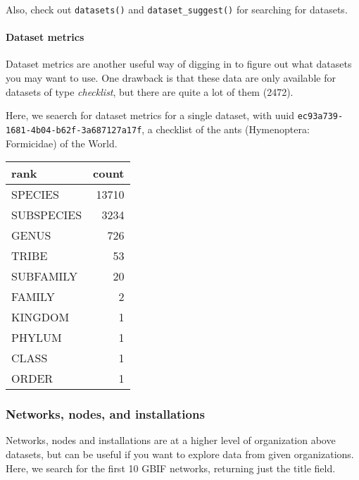 \documentclass[author-year, review, 11pt]{components/elsarticle} %
\newenvironment{Shaded}{\begin{snugshade}}{\end{snugshade}}
\newcommand{\KeywordTok}[1]{\textcolor[rgb]{0.13,0.29,0.53}{\textbf{{#1}}}}
\newcommand{\DataTypeTok}[1]{\textcolor[rgb]{0.13,0.29,0.53}{{#1}}}
\newcommand{\StringTok}[1]{\textcolor[rgb]{0.31,0.60,0.02}{{#1}}}
\newcommand{\NormalTok}[1]{{#1}}
\begin{document}
Also, check out \texttt{datasets()} and \texttt{dataset\_suggest()} for
searching for datasets.

\paragraph{Dataset metrics}\label{dataset-metrics}

Dataset metrics are another useful way of digging in to figure out what
datasets you may want to use. One drawback is that these data are only
available for datasets of type \emph{checklist}, but there are quite a
lot of them (2472).

Here, we seaerch for dataset metrics for a single dataset, with uuid
\texttt{ec93a739-1681-4b04-b62f-3a687127a17f}, a checklist of the ants
(Hymenoptera: Formicidae) of the World.

\begin{Shaded}
\end{Shaded}

\begin{longtable}[c]{@{}lr@{}}
\toprule
rank & count\tabularnewline
\midrule
\endhead
SPECIES & 13710\tabularnewline
SUBSPECIES & 3234\tabularnewline
GENUS & 726\tabularnewline
TRIBE & 53\tabularnewline
SUBFAMILY & 20\tabularnewline
FAMILY & 2\tabularnewline
KINGDOM & 1\tabularnewline
PHYLUM & 1\tabularnewline
CLASS & 1\tabularnewline
ORDER & 1\tabularnewline
\bottomrule
\end{longtable}

\subsubsection{Networks, nodes, and
installations}\label{networks-nodes-and-installations}

Networks, nodes and installations are at a higher level of organization
above datasets, but can be useful if you want to explore data from given
organizations. Here, we search for the first 10 GBIF networks, returning
just the title field.
\end{document}
